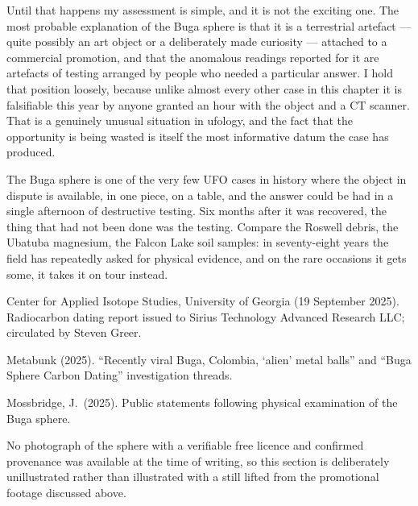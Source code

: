Until that happens my assessment is simple, and it is not the exciting one. The most probable
explanation of the Buga sphere is that it is a terrestrial artefact --- quite possibly an art object or
a deliberately made curiosity --- attached to a commercial promotion, and that the anomalous readings
reported for it are artefacts of testing arranged by people who needed a particular answer. I hold that
position loosely, because unlike almost every other case in this chapter it is falsifiable this year by
anyone granted an hour with the object and a CT scanner. That is a genuinely unusual situation in
ufology, and the fact that the opportunity is being wasted is itself the most informative datum the
case has produced.

\begin{funfact}
The Buga sphere is one of the very few UFO cases in history where the object in dispute is available,
in one piece, on a table, and the answer could be had in a single afternoon of destructive testing.
Six months after it was recovered, the thing that had not been done was the testing. Compare the
Roswell debris, the Ubatuba magnesium, the Falcon Lake soil samples: in seventy-eight years the field
has repeatedly asked for physical evidence, and on the rare occasions it gets some, it takes it on
tour instead.
\end{funfact}

\begin{srcnotes}
\item Center for Applied Isotope Studies, University of Georgia (19 September 2025). Radiocarbon
dating report issued to Sirius Technology Advanced Research LLC; circulated by Steven Greer.
\item Metabunk (2025). ``Recently viral Buga, Colombia, `alien' metal balls'' and ``Buga Sphere
Carbon Dating'' investigation threads.
\item Mossbridge, J.\ (2025). Public statements following physical examination of the Buga sphere.
\item No photograph of the sphere with a verifiable free licence and confirmed provenance was
available at the time of writing, so this section is deliberately unillustrated rather than
illustrated with a still lifted from the promotional footage discussed above.
\end{srcnotes}

